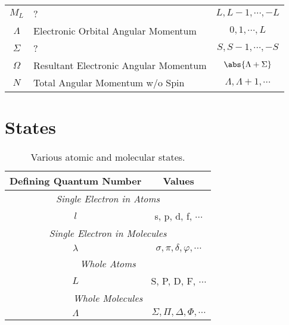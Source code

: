 \documentclass[11pt, twoside, fleqn]{report}
\begin{document}
\begin{table}[H]
\begin{tabular}{clc}
            \cmidrule(lr){1-3}
            $M_{L}$   & ?                                     & $L, L - 1, \dotsb, -L$                      \\
            $\Lambda$ & Electronic Orbital Angular Momentum   & $0, 1, \dotsb, L$                           \\
            $\Sigma$  & ?                                     & $S, S - 1, \dotsb, -S$                      \\
            $\Omega$  & Resultant Electronic Angular Momentum & $\abs{\Lambda + \Sigma}$                    \\
            $N$       & Total Angular Momentum w/o Spin       & $\Lambda, \Lambda + 1, \dotsb$              \\
            \bottomrule
        \end{tabular}
    \end{table}

    \chapter{States}
    \label{a:states}

    \begin{table}[H]
        \centering
        \caption{Various atomic and molecular states.}
        \label{t:states}
        \begin{tabular}{cc}
            \toprule
            Defining Quantum Number & Values                                 \\
            \midrule
            \multicolumn{2}{c}{\textit{Single Electron in Atoms}}            \\
            \cmidrule(lr){1-2}
            $l$                     & s, p, d, f, $\dotsb$                   \\
            \multicolumn{2}{c}{\textit{Single Electron in Molecules}}        \\
            \cmidrule(lr){1-2}
            $\lambda$               & $\sigma, \pi, \delta, \varphi, \dotsb$ \\
            \multicolumn{2}{c}{\textit{Whole Atoms}}                         \\
            \cmidrule(lr){1-2}
            $L$                     & S, P, D, F, $\dotsb$                   \\
            \multicolumn{2}{c}{\textit{Whole Molecules}}                     \\
            \cmidrule(lr){1-2}
            $\Lambda$               & $\Sigma, \Pi, \Delta, \Phi, \dotsb$    \\
            \bottomrule
        \end{tabular}
    \end{table}

    \printbibliography

    
\end{document}
